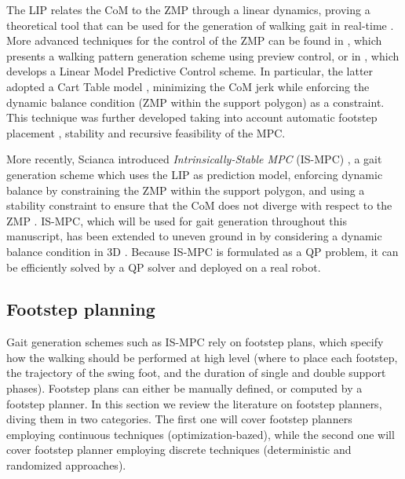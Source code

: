 The LIP relates the CoM to the ZMP through a linear dynamics, proving a 
theoretical tool that can be used for the generation of walking gait in 
real-time \cite{Sugihara2002ICRA}. More advanced techniques for the control 
of the ZMP can be found in \cite{Kajita2003BipedWalkingPatternGeneration}, which
presents a walking pattern generation scheme using preview control, or in
\cite{Wieber2006LMPCWalking}, which develops a Linear Model Predictive Control
scheme. In particular, the latter adopted a Cart Table model
\cite{Kajita2016IntroductiontoHumanoidRobotics}, minimizing the CoM jerk while enforcing the dynamic balance
condition (ZMP within the support polygon) as a constraint. This technique
was further developed taking into account automatic footstep placement
\cite{Herdt2010OnlineWalkingMotionGenerationWithAFSP}, stability \cite{Sherikov2014Humanoids}
and recursive feasibility \cite{Ciocca2017Humanoids} of the MPC.

More recently, Scianca introduced
\textit{Intrinsically-Stable MPC} (IS-MPC) \cite{Scianca2016ISMPC, Scianca2020TRO},
a gait generation scheme which 
uses the LIP as prediction model, enforcing dynamic balance
by constraining the ZMP within the support polygon,
and using a stability constraint to ensure that the CoM does not diverge 
with respect to the ZMP \cite{Lanari2015Inversionbasedgaitgeneration}. IS-MPC,
which will be used for gait generation throughout this manuscript,
has been extended to uneven ground in \cite{Zamparelli2018SYROCO} by
considering a dynamic balance condition in 3D
\cite{Caron2017DynamicWalkingOverRoughTerrains, Sugihara2021ICRA}. Because
IS-MPC is formulated as a QP problem, it can be efficiently solved by a 
QP solver and deployed on a real robot.

\subsection{Footstep planning}
Gait generation schemes such as IS-MPC rely on footstep plans, which specify 
how the walking should be performed at high level (where to place each footstep,
the trajectory of the swing foot, and the duration of single and double support
phases). Footstep plans can either be manually defined, or computed by a 
footstep planner. In this section we review the literature on footstep planners,
diving them in two categories. The first one will cover footstep planners 
employing continuous techniques (optimization-bazed),
while the second one will cover footstep planner employing discrete techniques
(deterministic and randomized approaches).

